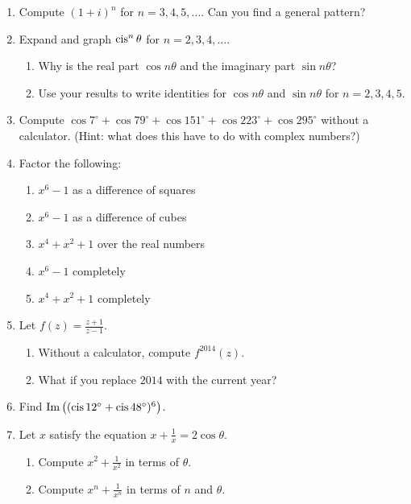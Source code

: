 \documentclass[../gatm.tex]{subfiles}
\begin{document}
\begin{enumerate}
\item Compute $(1+i)^n$ for $n=3,4,5,\ldots$. Can you find a general pattern?
\item Expand and graph $\operatorname{cis}^n \theta$ for $n=2,3,4,\ldots$.

\begin{enumerate}
\item Why is the real part $\cos n\theta$ and the imaginary part $\sin n\theta$?
\item Use your results to write identities for $\cos n\theta$ and $\sin n\theta$ for $n=2,3,4,5$.
\end{enumerate}

\newcommand{\cosdeg}[1] {\cos #1^\circ}

\item Compute $\cosdeg{7} + \cosdeg{79} + \cosdeg{151} + \cosdeg{223} + \cosdeg{295}$ without a calculator. (Hint: what does this have to do with complex numbers?)
\item Factor the following:
\begin{multicols}{2}
\begin{enumerate}
\item $x^6-1$ as a difference of squares
\item $x^6-1$ as a difference of cubes
\item $x^4+x^2+1$ over the real numbers
\item $x^6-1$ completely
\item $x^4+x^2+1$ completely
\end{enumerate}
\end{multicols}

\item Let $f(z)=\frac{z+1}{z-1}$.
\begin{enumerate}
\item Without a calculator, compute $f^{2014}(z)$.
\item What if you replace $2014$ with the current year?
\end{enumerate}

\item Find $\operatorname{Im}\left((\operatorname{cis} 12^\circ + \operatorname{cis} 48^\circ)^6\right)$.

\item Let $x$ satisfy the equation $x+\frac{1}{x}=2\cos\theta$.
\begin{enumerate}
\item Compute $x^2+\frac{1}{x^2}$ in terms of $\theta$.
\item Compute $x^n+\frac{1}{x^n}$ in terms of $n$ and $\theta$.
\end{enumerate}
\end{enumerate}
\end{document}
